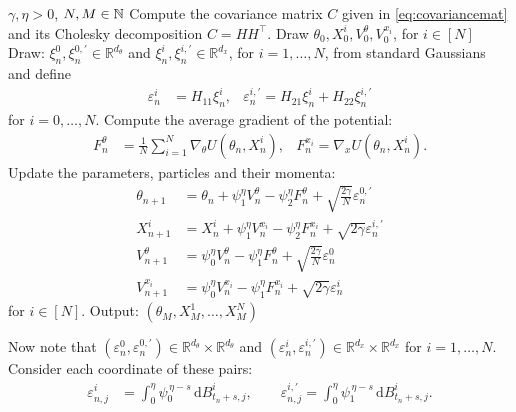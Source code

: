 \begin{algorithm}[b!]
\caption{\gls*{kiplmc1}}\label{alg:KIPLMC1}
\begin{algorithmic}[1]
\Require $\gamma, \eta > 0$, $N, M \in {\mathbb N}$
\State Compute the covariance matrix $C$ given in \eqref{eq:covariancemat} and its Cholesky decomposition $C = H H^\top$.
\State Draw $\theta_0, X^i_0, V^\theta_0, V^{x_i}_0$, for $i\in [N]$
    \State Draw: $\xi_n^0,\xi_n^{0,\prime}\in\mathbb{R}^{d_\theta}$ and $\xi_n^i, \xi_n^{i,\prime}\in\mathbb{R}^{d_x}$, for $i=1,\dots, N$, from standard Gaussians and define
    \begin{align*}
    \varepsilon_n^{i} &= H_{11} \xi_n^{i}, &
    \varepsilon_n^{i,\prime} = H_{21} \xi_n^i + H_{22}  \xi_n^{i,\prime}
\end{align*}
for $i = 0, \ldots, N$.
    \State Compute the average gradient of the potential:
    \begin{align*}
    F_{n}^{\theta} &= \frac{1}{N} \sum_{i=1}^N \nabla_\theta U(\theta_n, X^i_n), & 
    F_{n}^{x_i} = \nabla_x U(\theta_n, X^i_n).
    \end{align*}
    Update the parameters, particles and their momenta:
    \small
    \begin{align}
    \theta_{n+1} &= \theta_n + \psi_1^\eta V^{\theta}_n - {\psi_2^\eta} F_{n}^{\theta} + \sqrt{\frac{2\gamma}{N}} \varepsilon^{0, \prime}_{n} \nonumber \\
    X^i_{n+1} &= X^i_n + \psi_1^\eta V^{x_i}_n - \psi_2^\eta F_{n}^{x_i} + \sqrt{2\gamma}\varepsilon_{n}^{i,\prime} \tag{KIPLMC1} \label{eq:KIPLMC1} \\
    V^{\theta}_{n+1} &= \psi_0^\eta V^{\theta}_n - \psi_1^\eta F_{n}^{\theta} + \sqrt{\frac{2\gamma}{N}} \varepsilon^0_{n} \nonumber \\
    V^{x_i}_{n+1} &= \psi_0^\eta V^{x_i}_n - \psi_1^\eta F_{n}^{x_i} + \sqrt{2\gamma} \varepsilon^i_{n} \nonumber
    \end{align}
    for $i\in [N]$.
    \normalsize
    \EndFor
\State Output: $(\theta_{M}, X^1_M, \ldots, X^N_M)$
\end{algorithmic}
\end{algorithm}
Now note that $(\varepsilon_n^0, \varepsilon_n^{0,\prime}) \in \mathbb{R}^{d_\theta} \times \mathbb{R}^{d_\theta}$ and $(\varepsilon_n^i, \varepsilon_n^{i,\prime}) \in \mathbb{R}^{d_x} \times \mathbb{R}^{d_x}$ for $i=1,\ldots,N$. Consider each coordinate of these pairs:
\begin{align*}
\varepsilon_{n,j}^i &= \int_0^\eta \psi_0^{\,\eta-s}\,\mathrm{d}B_{t_n+s,j}^i,\qquad
\varepsilon_{n,j}^{i,\prime} = \int_0^\eta \psi_1^{\,\eta-s}\,\mathrm{d}B_{t_n+s,j}^i.
\end{align*}

